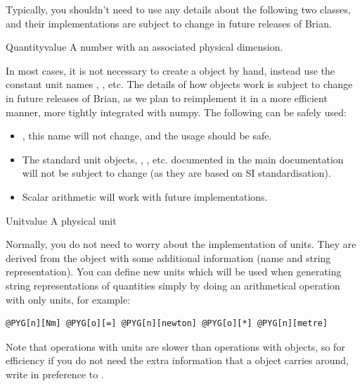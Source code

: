 \documentclass[letterpaper,10pt,english]{manual}
\begin{document}
Typically, you shouldn't need to use any details about the following
two classes, and their implementations are subject to change in
future releases of Brian.

\hypertarget{brian.Quantity}{}\begin{classdesc}{Quantity}{value}
A number with an associated physical dimension.

In most cases, it is not necessary to create a \hyperlink{brian.Quantity}{} object
by hand, instead use the constant unit names , ,
etc. The details of how \hyperlink{brian.Quantity}{} objects work is subject to
change in future releases of Brian, as we plan to reimplement it
in a more efficient manner, more tightly integrated with numpy. The
following can be safely used:
\begin{itemize}
\item {} 
\hyperlink{brian.Quantity}{}, this name will not change, and the usage
 should be safe.

\item {} 
The standard unit objects, , , etc.
documented in the main documentation will not be subject
to change (as they are based on SI standardisation).

\item {} 
Scalar arithmetic will work with future implementations.

\end{itemize}
\end{classdesc}

\hypertarget{brian.Unit}{}\begin{classdesc}{Unit}{value}
A physical unit

Normally, you do not need to worry about the implementation of
units. They are derived from the \hyperlink{brian.Quantity}{} object with
some additional information (name and string representation).
You can define new units which will be used when generating
string representations of quantities simply by doing an
arithmetical operation with only units, for example:

\begin{Verbatim}[commandchars=@\[\]]
@PYG[n][Nm] @PYG[o][=] @PYG[n][newton] @PYG[o][*] @PYG[n][metre]
\end{Verbatim}

Note that operations with units are slower than operations with
\hyperlink{brian.Quantity}{} objects, so for efficiency if you do not need the
extra information that a \hyperlink{brian.Unit}{} object carries around, write
 in preference to .
\end{classdesc}
\resetcurrentobjects
\hypertarget{--doc-reference-clocks}{}
\end{document}
